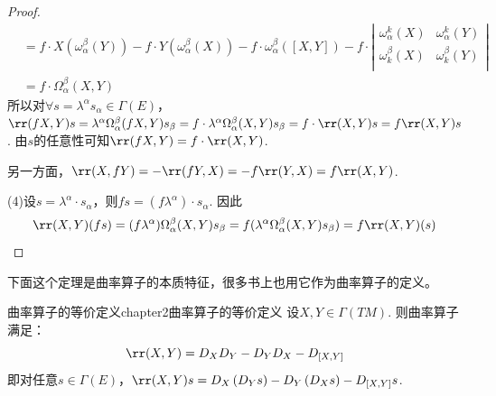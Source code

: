 \begin{proof}
\[\begin{split}
	&=f\cdot X\left(\omega^{\beta}_{\alpha}(Y) \right)-f\cdot Y\left(\omega^{\beta}_{\alpha}(X) \right)-f\cdot \omega^{\beta}_{\alpha}\left([X,Y] \right)-f\cdot \left| \begin{array}{cc}{\omega^{k}_{\alpha}(X)} & {\omega^{k}_{\alpha}(Y)}\\ {\omega^{\beta}_{k}(X)} & {\omega^{\beta}_{k}(Y)}\\ \end{array}\right|\\
	&=f\cdot \Omega^{\beta}_{\alpha}(X,Y)
	\end{split}
	\]
	所以对$\forall s=\lambda^{\alpha}s_{\alpha}\in \Gamma(E)$，$\rr(fX,Y)s=\lambda^{\alpha}\Omega^{\beta}_{\alpha}(fX,Y)s_{\beta}=f\cdot \lambda^{\alpha}\Omega^{\beta}_{\alpha}(X,Y)s_{\beta}=f\cdot \rr(X,Y)s=f\rr(X,Y)s$. 由$s$的任意性可知$\rr(fX,Y)=f\cdot \rr(X,Y)$. 
	
	另一方面，$\rr(X,fY)=-\rr(fY,X)=-f\rr(Y,X)=f\rr(X,Y)$.
	
	(4)设$s=\lambda^{\alpha}\cdot s_{\alpha}$，则$fs=(f\lambda^{\alpha})\cdot s_{\alpha}$. 因此
	\[\rr(X,Y)(fs)=(f\lambda^{\alpha})\Omega_{\alpha}^{\beta}(X,Y)s_{\beta}=f(\lambda^{\alpha}\Omega_{\alpha}^{\beta}(X,Y)s_{\beta})=f\rr(X,Y)(s)\]
\end{proof}

下面这个定理是曲率算子的本质特征，很多书上也用它作为曲率算子的定义。
\begin{mythm}{曲率算子的等价定义}{chapter2曲率算子的等价定义}
	设$X,Y\in \Gamma(TM)$. 则曲率算子满足：
	\[
	\rr(X,Y)=D_{X}D_{Y}-D_{Y}D_{X}-D_{[X,Y]}
	\]
	即对任意$s\in \Gamma(E)$，$\rr(X,Y)s=D_{X}\left(D_{Y}s\right)-D_{Y}\left(D_{X}s\right)-D_{[X,Y]}s$.
\end{mythm}


